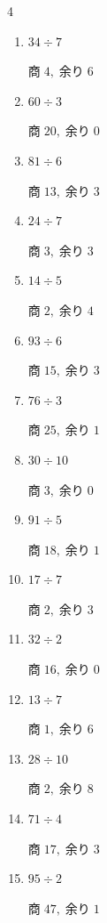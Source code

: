 \begin{multicols}{4}
\begin{enumerate}
\columnbreak %

  \item $34 \div 7$

        $商\; 4,\; 余り\; 6$

  \item $60 \div 3$

        $商\; 20,\; 余り\; 0$

  \item $81 \div 6$

        $商\; 13,\; 余り\; 3$

  \item $24 \div 7$

        $商\; 3,\; 余り\; 3$

  \item $14 \div 5$

        $商\; 2,\; 余り\; 4$

  \item $93 \div 6$

        $商\; 15,\; 余り\; 3$

  \item $76 \div 3$

        $商\; 25,\; 余り\; 1$

  \item $30 \div 10$

        $商\; 3,\; 余り\; 0$

  \item $91 \div 5$

        $商\; 18,\; 余り\; 1$

  \item $17 \div 7$

        $商\; 2,\; 余り\; 3$

  \item $32 \div 2$

        $商\; 16,\; 余り\; 0$

  \item $13 \div 7$

        $商\; 1,\; 余り\; 6$

  \item $28 \div 10$

        $商\; 2,\; 余り\; 8$

  \item $71 \div 4$

        $商\; 17,\; 余り\; 3$

  \item $95 \div 2$

        $商\; 47,\; 余り\; 1$


\end{enumerate}
\end{multicols}
